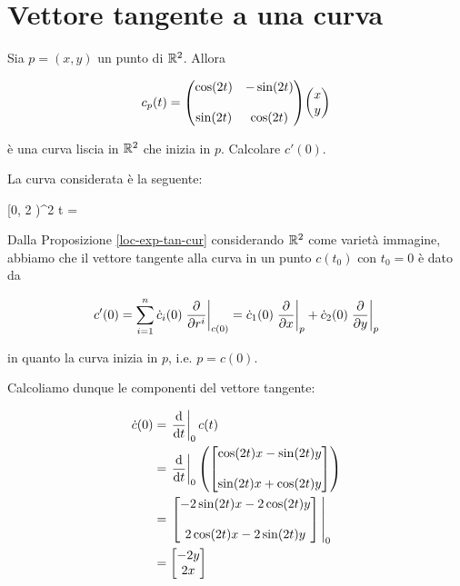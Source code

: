 %

\newpage

%

\section{Vettore tangente a una curva}\label{es2-10}

\begin{tcolorbox}
	Sia $ p = (x,y) $ un punto di $ \mathbb{R}^{2} $. Allora
	
	\begin{equation}
		c_{p}(t) = \mqty( \cos(2t) & -\sin(2t) \\\\ \sin(2t) & \cos(2t) ) \mqty(x \\ y)
	\end{equation}
	
	è una curva liscia in $ \mathbb{R}^{2} $ che inizia in $ p $. Calcolare $ c'(0) $.
\end{tcolorbox}

La curva considerata è la seguente:

	{[0, 2 \pi)}{\R^{2}}
	{t}{%
		= }

Dalla Proposizione \ref{loc-exp-tan-cur} considerando $ \mathbb{R}^{2} $ come varietà immagine, abbiamo che il vettore tangente alla curva in un punto $ c(t_{0}) $ con $ t_{0} = 0 $ è dato da

\begin{equation}
	c'(0) = \sum_{i=1}^{n} \dot{c}_{i}(0) \eval{ \pdv{r^{i}} }_{c(0)} %
	= \dot{c}_{1}(0) \eval{ \pdv{x} }_{p} + \dot{c}_{2}(0) \eval{ \pdv{y} }_{p}
\end{equation}

in quanto la curva inizia in $ p $, i.e. $ p = c(0) $.

Calcoliamo dunque le componenti del vettore tangente:

\begin{align}
	\begin{split}
		\dot{c}(0) &= \eval{ \dv{t} }_{0} c(t)\\
		&= \eval{ \dv{t} }_{0} \left( \bmqty{ \cos(2t) x - \sin(2t) y \\\\ \sin(2t) x + \cos(2t) y } \right)\\
		&= \eval{ \bmqty{ - 2 \sin(2t) x - 2 \cos(2t) y \\\\ 2 \cos(2t) x - 2 \sin(2t) y } }_{0}\\
		&= \bmqty{ - 2 y \\ 2x }
	\end{split}
\end{align}

